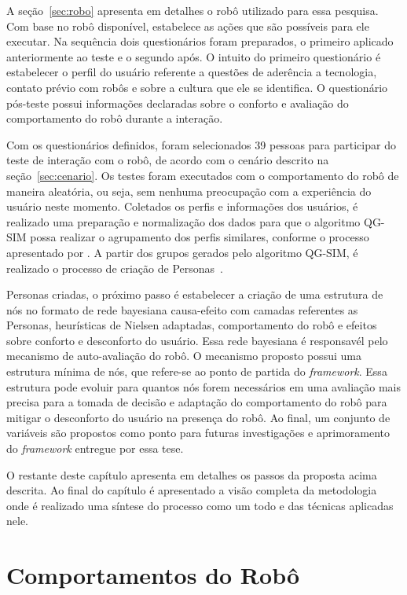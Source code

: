 A seção~\ref{sec:robo} apresenta em detalhes o robô utilizado para essa pesquisa. Com base no robô disponível, estabelece as ações que são possíveis para ele executar. Na sequência dois questionários foram preparados, o primeiro aplicado anteriormente ao teste e o segundo após. O intuito do primeiro questionário é estabelecer o perfil do usuário referente a questões de aderência a tecnologia, contato prévio com robôs e sobre a cultura que ele se identifica. O questionário pós-teste possui informações declaradas sobre o conforto e avaliação do comportamento do robô durante a interação.

Com os questionários definidos, foram selecionados 39 pessoas para participar do teste de interação com o robô, de acordo com o cenário descrito na seção~\ref{sec:cenario}. Os testes foram executados com o comportamento do robô de maneira aleatória, ou seja, sem nenhuma preocupação com a experiência do usuário neste momento. Coletados os perfis e informações dos usuários, é realizado uma preparação e normalização dos dados para que o algoritmo QG-SIM possa realizar o agrupamento dos perfis similares, conforme o processo apresentado por . A partir dos grupos gerados pelo algoritmo QG-SIM, é realizado o processo de criação de Personas~\cite{masiero:2013, masiero:2013b}.

Personas criadas, o próximo passo é estabelecer a criação de uma estrutura de nós no formato de rede bayesiana causa-efeito com camadas referentes as Personas, heurísticas de Nielsen adaptadas, comportamento do robô e efeitos sobre conforto e desconforto do usuário. Essa rede bayesiana é responsavél pelo mecanismo de auto-avaliação do robô. O mecanismo proposto possui uma estrutura mínima de nós, que refere-se ao ponto de partida do \emph{framework}. Essa estrutura pode evoluir para quantos nós forem necessários em uma avaliação mais precisa para a tomada de decisão e adaptação do comportamento do robô para mitigar o desconforto do usuário na presença do robô. Ao final, um conjunto de variáveis são propostos como ponto para futuras investigações e aprimoramento do \emph{framework} entregue por essa tese.

O restante deste capítulo apresenta em detalhes os passos da proposta acima descrita. Ao final do capítulo é apresentado a visão completa da metodologia onde é realizado uma síntese do processo como um todo e das técnicas aplicadas nele.

\section{Comportamentos do Robô}
\label{sec:comportamento-robo}



